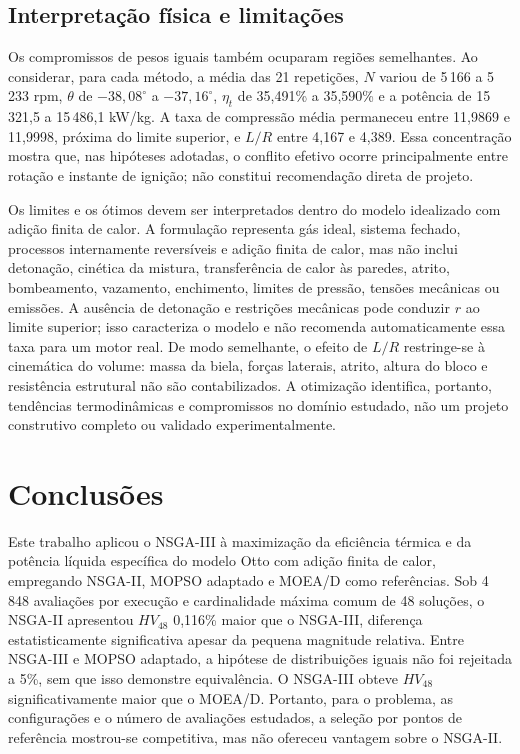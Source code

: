 \documentclass[a4paper,11pt]{article}
\begin{document}
\subsection{Interpretação física e limitações}

Os compromissos de pesos iguais também ocuparam regiões semelhantes. Ao
considerar, para cada método, a média das 21 repetições, $N$ variou de 5\,166 a
5\,233 rpm, $\theta$ de
$-38{,}08^\circ$ a $-37{,}16^\circ$, $\eta_t$ de 35,491\% a 35,590\% e a
potência de 15\,321,5 a 15\,486,1 kW/kg. A taxa de compressão média permaneceu
entre 11,9869 e 11,9998, próxima do limite superior, e $L/R$ entre 4,167 e
4,389. Essa concentração mostra que, nas hipóteses adotadas, o conflito efetivo
ocorre principalmente entre rotação e instante de ignição; não constitui
recomendação direta de projeto.

Os limites e os ótimos devem ser interpretados dentro do modelo idealizado com
adição finita de calor. A formulação representa gás ideal, sistema fechado,
processos internamente reversíveis e adição finita de calor, mas não inclui
detonação, cinética da
mistura, transferência de calor às paredes, atrito, bombeamento, vazamento,
enchimento, limites de pressão, tensões mecânicas ou emissões. A ausência de
detonação e restrições mecânicas pode conduzir $r$ ao limite superior; isso
caracteriza o modelo e não recomenda automaticamente essa taxa para um motor
real. De modo semelhante, o efeito de $L/R$ restringe-se à cinemática do
volume: massa da biela, forças laterais, atrito, altura do bloco e resistência
estrutural não são contabilizados. A otimização identifica, portanto,
tendências termodinâmicas e compromissos no domínio estudado, não um projeto
construtivo completo ou validado experimentalmente.

\section{Conclusões}\label{sec:conclusoes}

Este trabalho aplicou o NSGA-III à maximização da eficiência térmica e da
potência líquida específica do modelo Otto com adição finita de calor,
empregando NSGA-II, MOPSO adaptado e MOEA/D como referências. Sob 4\,848
avaliações por execução e cardinalidade máxima comum de 48 soluções, o NSGA-II
apresentou $HV_{48}$ 0,116\% maior que o NSGA-III, diferença estatisticamente
significativa apesar da pequena magnitude relativa. Entre NSGA-III e MOPSO
adaptado, a hipótese de distribuições iguais não foi rejeitada a 5\%, sem que
isso demonstre equivalência. O NSGA-III obteve $HV_{48}$ significativamente
maior que o MOEA/D. Portanto, para o problema, as configurações e o número de
avaliações estudados, a seleção por pontos de referência mostrou-se
competitiva, mas não ofereceu vantagem sobre o NSGA-II.
\end{document}

